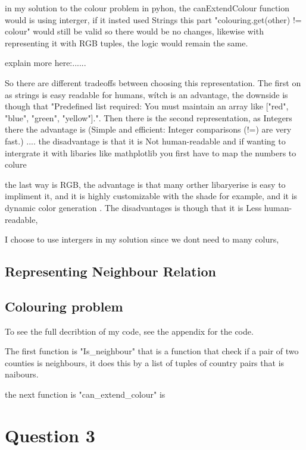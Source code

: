 \documentclass{article}
\begin{document}
in my solution to the colour problem in pyhon, the canExtendColour function would is using interger, if it insted used Strings this part "colouring.get(other) != colour" would still be valid  so there would be no changes, likewise with representing it with RGB tuples, the logic would remain the same. 

explain more here:......



So there are different tradeoffs between choosing this representation. The first on as strings is easy readable for humans, wítch is an advantage, the downside is though that "Predefined list required: You must maintain an array like ["red", "blue", "green", "yellow"].". Then there is the second representation, as Integers there the advantage is (Simple and efficient: Integer comparisons (!=) are very fast.)  .... the disadvantage is that it is Not human-readable and if wanting to intergrate it with libaries like mathplotlib you first have to map the numbers to colure

the last way is RGB, the advantage is that many orther libaryerise is easy to impliment it, and it is highly customizable with the shade for example, and it is dynamic color generation . The disadvantages is though that it is Less human-readable, 

I choose to use intergers in my solution since we dont need to many colurs, 

\subsection{Representing Neighbour Relation}






\subsection{Colouring problem}

To see the full decribtion of my code, see the appendix for the code. 

The first function is "Is_neighbour" that is a function that check if a pair of two counties is neighbours, it does this by a list of tuples of country pairs that is naibours.

the next function is "can_extend_colour" is 



\section{ Question 3}
\end{document}
